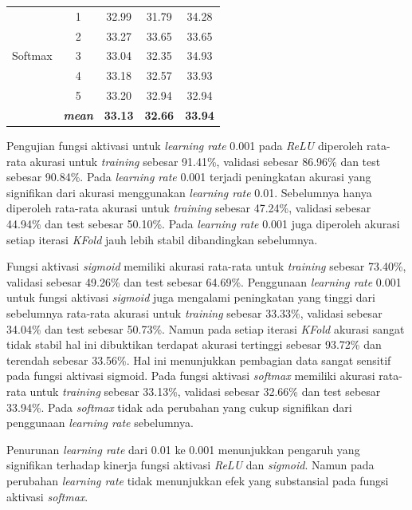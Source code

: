 \begin{table}[H]
\begin{table}[H]
\begin{tabular}{ccccc}
            \multirow{5}{*}{Softmax}
            & 1 & 32.99 & 31.79 & 34.28 \\
            & 2 & 33.27 & 33.65 & 33.65 \\
            & 3 & 33.04 & 32.35 & 34.93  \\
            & 4 & 33.18 & 32.57 & 33.93 \\
            & 5 & 33.20 & 32.94 & 32.94 \\
            & \textit{\textbf{mean}}& \textbf{33.13} & \textbf{32.66} &\textbf{33.94} \\ 

            \bottomrule
        \end{tabular}
        \label{Pengujian Learning Rate 0.001}
    \end{table}

    Pengujian fungsi aktivasi untuk \textit{learning rate} 0.001 
    pada \textit{ReLU} diperoleh rata-rata akurasi untuk \textit{training} sebesar 91.41\%, validasi sebesar 86.96\% dan test sebesar 90.84\%. Pada \textit{learning rate} 0.001 terjadi peningkatan akurasi yang signifikan dari akurasi menggunakan \textit{learning rate} 0.01. Sebelumnya hanya diperoleh rata-rata akurasi untuk \textit{training} sebesar 47.24\%, validasi sebesar 44.94\% dan test sebesar 50.10\%. Pada \textit{learning rate} 0.001 juga diperoleh akurasi setiap iterasi \textit{KFold} jauh lebih stabil dibandingkan sebelumnya. 

    Fungsi aktivasi \textit{sigmoid} memiliki akurasi rata-rata untuk \textit{training} sebesar 73.40\%, validasi sebesar 49.26\% dan test sebesar 64.69\%. Penggunaan \textit{learning rate} 0.001 untuk fungsi aktivasi \textit{sigmoid} juga mengalami peningkatan yang tinggi dari sebelumnya rata-rata akurasi untuk \textit{training} sebesar 33.33\%, validasi sebesar 34.04\% dan test sebesar 50.73\%. Namun pada setiap iterasi \textit{KFold} akurasi sangat tidak stabil hal ini dibuktikan terdapat akurasi tertinggi sebesar 93.72\% dan terendah sebesar 33.56\%. Hal ini menunjukkan pembagian data sangat sensitif pada fungsi aktivasi sigmoid. Pada fungsi aktivasi \textit{softmax} memiliki akurasi rata-rata untuk \textit{training} sebesar 33.13\%, validasi sebesar 32.66\% dan test sebesar 33.94\%. Pada \textit{softmax} tidak ada perubahan yang cukup signifikan dari penggunaan \textit{learning rate} sebelumnya. 

     Penurunan \textit{learning rate} dari 0.01 ke 0.001 menunjukkan pengaruh yang signifikan terhadap kinerja fungsi aktivasi \textit{ReLU} dan \textit{sigmoid}. Namun pada perubahan \textit{learning rate} tidak menunjukkan efek yang substansial pada fungsi aktivasi \textit{softmax}.
    

\end{table}
